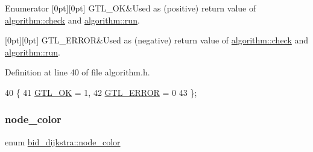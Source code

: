 \begin{DoxyEnumFields}{Enumerator}
[0pt][0pt]{}\mbox{\label{classalgorithm_af1a0078e153aa99c24f9bdf0d97f6710a5114c20e4a96a76b5de9f28bf15e282b}} 
G\+T\+L\+\_\+\+OK&Used as (positive) return value of \mbox{\hyperlink{classalgorithm_a76361fb03ad1cf643affc51821e43bed}{algorithm\+::check}} and \mbox{\hyperlink{classalgorithm_a734b189509a8d6b56b65f8ff772d43ca}{algorithm\+::run}}. \\
\hline

[0pt][0pt]{}\mbox{\label{classalgorithm_af1a0078e153aa99c24f9bdf0d97f6710a6fcf574690bbd6cf710837a169510dd7}} 
G\+T\+L\+\_\+\+E\+R\+R\+OR&Used as (negative) return value of \mbox{\hyperlink{classalgorithm_a76361fb03ad1cf643affc51821e43bed}{algorithm\+::check}} and \mbox{\hyperlink{classalgorithm_a734b189509a8d6b56b65f8ff772d43ca}{algorithm\+::run}}. \\
\hline

\end{DoxyEnumFields}


Definition at line 40 of file algorithm.\+h.


\begin{DoxyCode}
40          \{
41     \mbox{\hyperlink{classalgorithm_af1a0078e153aa99c24f9bdf0d97f6710a5114c20e4a96a76b5de9f28bf15e282b}{GTL\_OK}} = 1,
42     \mbox{\hyperlink{classalgorithm_af1a0078e153aa99c24f9bdf0d97f6710a6fcf574690bbd6cf710837a169510dd7}{GTL\_ERROR}} = 0
43     \};
\end{DoxyCode}
\mbox{\label{classbid__dijkstra_a8b7dcccc9fab2ec5edc8da01029c09d5}} 
\subsubsection{\texorpdfstring{node\+\_\+color}{node\_color}}
{\footnotesize\ttfamily enum \mbox{\hyperlink{classbid__dijkstra_a8b7dcccc9fab2ec5edc8da01029c09d5}{bid\+\_\+dijkstra\+::node\+\_\+color}}}

